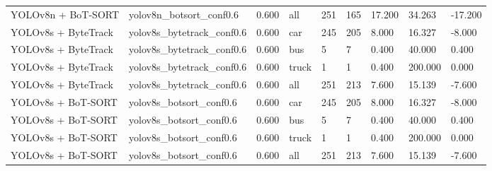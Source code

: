\begin{tabular}{lllllllll}
YOLOv8n + BoT-SORT & yolov8n\_botsort\_conf0.6 & 0.600 & all & 251 & 165 & 17.200 & 34.263 & -17.200 \\
YOLOv8s + ByteTrack & yolov8s\_bytetrack\_conf0.6 & 0.600 & car & 245 & 205 & 8.000 & 16.327 & -8.000 \\
YOLOv8s + ByteTrack & yolov8s\_bytetrack\_conf0.6 & 0.600 & bus & 5 & 7 & 0.400 & 40.000 & 0.400 \\
YOLOv8s + ByteTrack & yolov8s\_bytetrack\_conf0.6 & 0.600 & truck & 1 & 1 & 0.400 & 200.000 & 0.000 \\
YOLOv8s + ByteTrack & yolov8s\_bytetrack\_conf0.6 & 0.600 & all & 251 & 213 & 7.600 & 15.139 & -7.600 \\
YOLOv8s + BoT-SORT & yolov8s\_botsort\_conf0.6 & 0.600 & car & 245 & 205 & 8.000 & 16.327 & -8.000 \\
YOLOv8s + BoT-SORT & yolov8s\_botsort\_conf0.6 & 0.600 & bus & 5 & 7 & 0.400 & 40.000 & 0.400 \\
YOLOv8s + BoT-SORT & yolov8s\_botsort\_conf0.6 & 0.600 & truck & 1 & 1 & 0.400 & 200.000 & 0.000 \\
YOLOv8s + BoT-SORT & yolov8s\_botsort\_conf0.6 & 0.600 & all & 251 & 213 & 7.600 & 15.139 & -7.600 \\
\bottomrule
\end{tabular}

